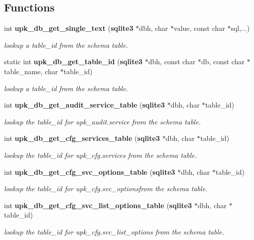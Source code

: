 \subsection*{Functions}
\begin{DoxyCompactItemize}
\item 
int {\bf upk\_\-db\_\-get\_\-single\_\-text} ({\bf sqlite3} $\ast$dbh, char $\ast$value, const char $\ast$sql,...)
\begin{DoxyCompactList}\small\item\em lookup a table\_\-id from the schema table. \end{DoxyCompactList}\item 
static int {\bf upk\_\-db\_\-get\_\-table\_\-id} ({\bf sqlite3} $\ast$dbh, const char $\ast$db, const char $\ast$table\_\-name, char $\ast$table\_\-id)
\begin{DoxyCompactList}\small\item\em lookup a table\_\-id from the schema table. \end{DoxyCompactList}\item 
int {\bf upk\_\-db\_\-get\_\-audit\_\-service\_\-table} ({\bf sqlite3} $\ast$dbh, char $\ast$table\_\-id)
\begin{DoxyCompactList}\small\item\em lookup the table\_\-id for upk\_\-audit.service from the schema table. \end{DoxyCompactList}\item 
int {\bf upk\_\-db\_\-get\_\-cfg\_\-services\_\-table} ({\bf sqlite3} $\ast$dbh, char $\ast$table\_\-id)
\begin{DoxyCompactList}\small\item\em lookup the table\_\-id for upk\_\-cfg.services from the schema table. \end{DoxyCompactList}\item 
int {\bf upk\_\-db\_\-get\_\-cfg\_\-svc\_\-options\_\-table} ({\bf sqlite3} $\ast$dbh, char $\ast$table\_\-id)
\begin{DoxyCompactList}\small\item\em lookup the table\_\-id for upk\_\-cfg.svc\_\-optionsfrom the schema table. \end{DoxyCompactList}\item 
int {\bf upk\_\-db\_\-get\_\-cfg\_\-svc\_\-list\_\-options\_\-table} ({\bf sqlite3} $\ast$dbh, char $\ast$table\_\-id)
\begin{DoxyCompactList}\small\item\em lookup the table\_\-id for upk\_\-cfg.svc\_\-list\_\-options from the schema table. \end{DoxyCompactList}\item 

\end{DoxyCompactItemize}
